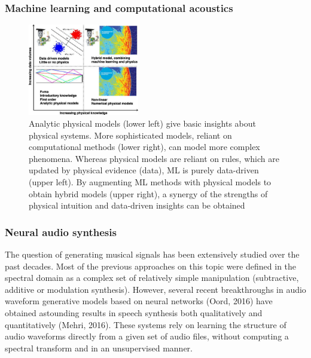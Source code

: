 \documentclass{beamer}
\begin{document}
\begin{frame}
	\frametitle{Machine learning and computational acoustics}
	\begin{figure}
	\includegraphics[height=4cm]{./6_5_ml_acoustics.jpg}
		\caption{Analytic physical models (lower left) give basic insights about physical systems. More sophisticated models, reliant on computational methods (lower right), can model more complex phenomena. Whereas physical models are reliant on rules, which are updated by physical evidence (data), ML is purely data-driven (upper left). By augmenting ML methods with physical models to obtain hybrid models (upper right), a synergy of the strengths of physical intuition and data-driven insights can be obtained }
	\end{figure}
\end{frame}


\begin{frame}
	\frametitle{Neural audio synthesis}
	The question of generating musical signals has been extensively studied over the past decades. Most of the previous approaches on this topic were defined in the spectral domain as a complex set of relatively simple manipulation (subtractive, additive or modulation synthesis). However, several recent breakthroughs in audio waveform generative models based on neural networks (Oord, 2016) have obtained astounding results in speech synthesis both qualitatively and quantitatively (Mehri, 2016). These systems rely on learning the structure of audio waveforms directly from a given set of audio files, without computing a spectral transform and in an unsupervised manner.
\end{frame}
\end{document}
